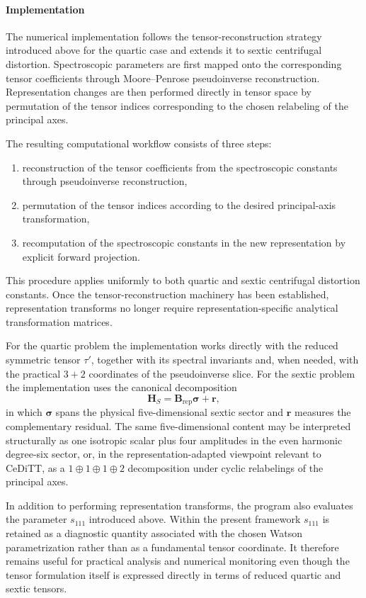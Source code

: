 \paragraph{Implementation}

The numerical implementation follows the tensor-reconstruction strategy
introduced above for the quartic case and extends it to sextic
centrifugal distortion.
Spectroscopic parameters are first mapped onto the corresponding tensor
coefficients through Moore--Penrose pseudoinverse reconstruction.
Representation changes are then performed directly in tensor space by
permutation of the tensor indices corresponding to the chosen
relabeling of the principal axes.

The resulting computational workflow consists of three steps:

\begin{enumerate}
\item reconstruction of the tensor coefficients from the spectroscopic
constants through pseudoinverse reconstruction,
\item permutation of the tensor indices according to the desired
principal-axis transformation,
\item recomputation of the spectroscopic constants in the new
representation by explicit forward projection.
\end{enumerate}

This procedure applies uniformly to both quartic and sextic centrifugal
distortion constants. Once the tensor-reconstruction machinery has been
established, representation transforms no longer require
representation-specific analytical transformation matrices.

For the quartic problem the implementation works directly with the
reduced symmetric tensor $\tau'$, together with its spectral
invariants and, when needed, with the practical $3+2$ coordinates of
the pseudoinverse slice. For the sextic problem the implementation
uses the canonical decomposition
\[
\mathbf H_S=\mathbf B_{\mathrm{rep}}\boldsymbol\sigma+\mathbf r,
\]
in which $\boldsymbol\sigma$ spans the physical five-dimensional
sextic sector and $\mathbf r$ measures the complementary residual.
The same five-dimensional content may be interpreted structurally as
one isotropic scalar plus four amplitudes in the even harmonic
degree-six sector, or, in the representation-adapted viewpoint
relevant to CeDiTT, as a $1\oplus1\oplus1\oplus2$ decomposition under
cyclic relabelings of the principal axes.

In addition to performing representation transforms, the program also
evaluates the parameter $s_{111}$ introduced above. Within the present
framework $s_{111}$ is retained as a diagnostic quantity associated
with the chosen Watson parametrization rather than as a fundamental
tensor coordinate. It therefore remains useful for practical analysis
and numerical monitoring even though the tensor formulation itself is
expressed directly in terms of reduced quartic and sextic tensors.


